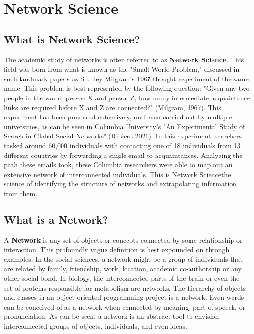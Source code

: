 \documentclass{article}
\begin{document}
\section*{Network Science}

\subsection*{What is Network Science?}
The academic study of networks is often referred to as \textbf{Network Science}. This field was born from what is known as the "Small World Problem,"
discussed in such landmark papers as Stanley Milgram's 1967 thought experiment of the same name. This problem is best represented by the following question:
"Given any two people in the world, person X and person Z, how many intermediate acquaintance links are required before X and Z are connected?" (Milgram, 1967). This experiment has been
pondered extensively, and even carried out by multiple universities, as can be seen in Columbia University's "An Experimental Study of Search in Global Social Networks" (Ribiero 2020). In this experiment,
searchers tasked around 60,000 individuals with contacting one of 18 individuals from 13 different countries by forwarding a single email to acquaintances. Analyzing the path these emails took,
these Columbia researchers were able to map out an extensive network of interconnected individuals. This is Network Science\textemdash the science of identifying the structure of networks and extrapolating information
from them.

\subsection*{What is a Network?}
A \textbf{Network} is any set of objects or concepts connected by some relationship or interaction. 
This profoundly vague definition is best expounded on through examples. In the social sciences, a network might be a group of individuals that are related by family, friendship, work, location, academic co-authorship or any other social bond. 
In biology, the interconnected parts of the brain or even the set of proteins responsible for metabolism are networks. 
The hierarchy of objects and classes in an object-oriented programming project is a network. 
Even words can be conceived of as a network when connected by meaning, part of speech, or pronunciation. As can be seen, a network is an abstract tool to envision 
interconnected groups of objects, individuals, and even ideas.   
\end{document}
